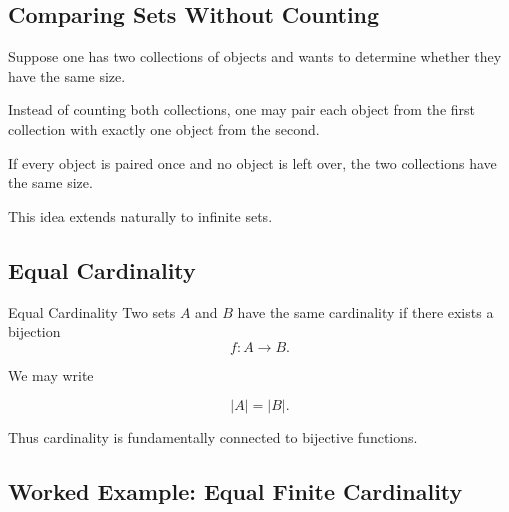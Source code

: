 \subsection{Comparing Sets Without Counting}
\label{subsec:comparing-without-counting}

Suppose one has two collections of objects and wants to determine whether they
have the same size.

Instead of counting both collections, one may pair each object from the first
collection with exactly one object from the second.

If every object is paired once and no object is left over, the two collections
have the same size.

This idea extends naturally to infinite sets.

\subsection{Equal Cardinality}
\label{subsec:equal-cardinality}

\begin{definitionbox}{Equal Cardinality}
Two sets \(A\) and \(B\) have the same cardinality if there exists a bijection
\[ f:A\to B. \]
\end{definitionbox}

We may write

\[ |A|=|B|. \]

Thus cardinality is fundamentally connected to bijective functions.

\subsection{Worked Example: Equal Finite Cardinality}
\label{subsec:worked-equal-finite-cardinality}

